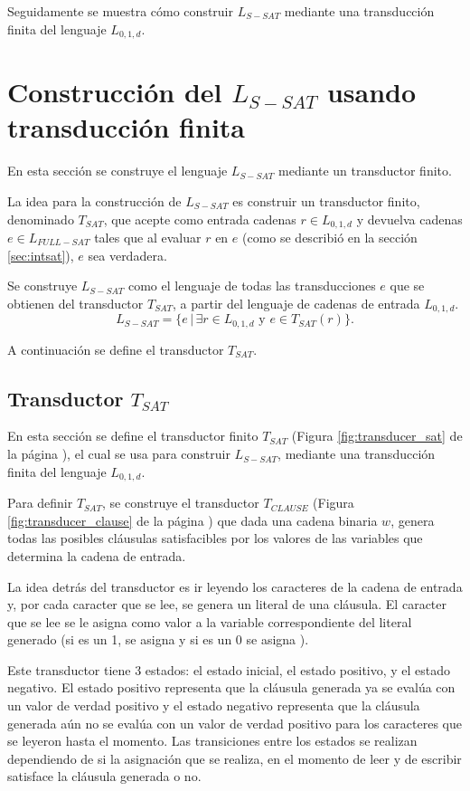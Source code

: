 Seguidamente se muestra cómo construir $L_{S-SAT}$ mediante una transducción finita del lenguaje $L_{0,1,d}$.

\section{Construcción del $L_{S-SAT}$ usando transducción finita}

En esta sección se construye el lenguaje $L_{S-SAT}$ mediante un transductor finito.

La idea para la construcción de $L_{S-SAT}$ es construir un transductor finito, denominado $T_{SAT}$, que acepte como entrada cadenas $r\in L_{0,1,d}$ y devuelva cadenas $e\in L_{FULL-SAT}$ tales que al evaluar $r$ en $e$ (como se describió en la sección \ref{sec:intsat}), $e$ sea verdadera.

Se construye $L_{S-SAT}$ como el lenguaje de todas las transducciones $e$ que se obtienen del transductor $T_{SAT}$, a partir del lenguaje de cadenas de entrada $L_{0,1,d}$.
$$L_{S-SAT} = \{e\,|\,\exists r \in L_{0,1,d} \text{ y } e \in T_{SAT}(r) \}.$$

A continuación se define el transductor $T_{SAT}$.

\subsection{Transductor $T_{SAT}$}
\label{sec:tsat}

En esta sección se define el transductor finito $T_{SAT}$ (Figura \ref{fig:transducer_sat} de la página \pageref{fig:transducer_sat}), el cual se usa para construir $L_{S-SAT}$, mediante una transducción finita del lenguaje $L_{0,1,d}$.

Para definir $T_{SAT}$, se construye el transductor $T_{CLAUSE}$ (Figura \ref{fig:transducer_clause} de la página \pageref{fig:transducer_clause}) que dada una cadena binaria $w$, genera todas las posibles cláusulas satisfacibles por los valores de las variables que determina la cadena de entrada.

La idea detrás del transductor es ir leyendo los caracteres de la cadena de entrada y, por cada caracter que se lee, se genera un literal de una cláusula. El caracter que se lee se le asigna como valor a la variable correspondiente del literal generado (si es un 1, se asigna \true{} y si es un 0 se asigna \false{}).

Este transductor tiene 3 estados: el estado inicial, el estado positivo, y el estado negativo.  
El estado positivo representa que la cláusula generada ya se evalúa con un valor de verdad positivo y 
el estado negativo representa que la cláusula generada aún no se evalúa con un valor de verdad positivo 
para los caracteres que se leyeron hasta el momento. Las transiciones entre los estados se realizan 
dependiendo de si la asignación que se realiza, en el momento de leer y de escribir satisface la cláusula 
generada o no.


